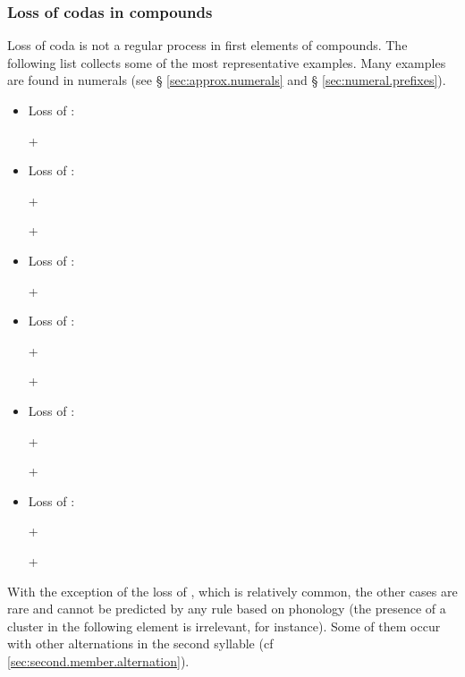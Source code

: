 \subsubsection{Loss of codas in compounds} \label{sec:loss.codas.compounds}
Loss of coda is not a regular process in first elements of compounds. The following list collects some of the most representative examples. Many examples are found in numerals (see § \ref{sec:approx.numerals} and § \ref{sec:numeral.prefixes}).

\begin{itemize}
\item Loss of : 

  +  \fl{}    
\item Loss of  : 

 +  \fl{}   

  +  \fl{}   
\item Loss of : 

  +  \fl{}    
\item Loss of :

  +  \fl{}   

 +  \fl{}    
\item Loss of :

   +   \fl{}    
 
  +  \fl{}   
\item Loss of : 

 +  \fl{}    

 +  \fl{}    
\end{itemize}

With the exception of the loss of , which is relatively common, the other cases are rare and cannot be predicted by any rule based on phonology (the presence of a cluster in the following element is irrelevant, for instance). Some of them occur with other alternations in the second syllable (cf \ref{sec:second.member.alternation}).

